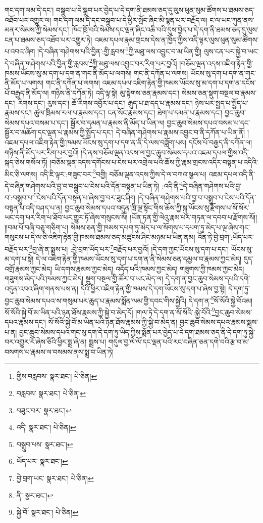 གང་དག་ལམ་དེ་དང་། བསྒྲུབ་པ་དེ་སྒྲུབ་པར་བྱེད་པ་དེ་དག་ནི་ཐམས་ཅད་དུ་ལུས་ཕུན་སུམ་ཚོགས་པ་ཐམས་ཅད་འཐོབ་པར་འགྱུར་ལ། གང་དག་ལམ་དེ་དང་བསྒྲུབ་པ་དེ་ཕྱིར་སྤོང་ཞིང་མི་སྙན་པར་བརྗོད་ལ། ང་ལ་ཡང་ཀུན་ནས་མནར་སེམས་ཀྱི་སེམས་དང་། ཁོང་ཁྲོ་བའི་སེམས་དང་ལྡན་ཞིང་འཆི་བའི་དུས་བྱེད་པ་དེ་དག་ནི་ཐམས་ཅད་དུ་ལུས་ངན་པ་ཐམས་ཅད་འཐོབ་པར་འགྱུར་ཏེ། འཇམ་དཔལ་རྣམ་གྲངས་དེས་ན་ཁྱོད་ཀྱིས་འདི་ལྟར་ལུས་ཕུན་སུམ་ཚོགས་པ་འབའ་ཞིག །དེ་བཞིན་གཤེགས་པའི་བྱིན་:གྱི་རླབས་\footnote{གྱིས་བརླབས་  སྣར་ཐང་།  པེ་ཅིན། }ཀྱི་མཐུ་ལས་འབྱུང་བ་མ་ཡིན་གྱི། ལུས་ངན་པར་སྐྱེ་བ་ཡང་དེ་བཞིན་གཤེགས་པའི་བྱིན་གྱི་རླབས་\footnote{བརླབས་  སྣར་ཐང་།  པེ་ཅིན། }ཀྱི་མཐུ་ལས་འབྱུང་བར་རིག་པར་བྱའོ། །བཅོམ་ལྡན་འདས་འཇིག་རྟེན་གྱི་ཁམས་ཡོངས་སུ་མ་དག་པ་དག་ན་གང་ནི་མོད་པ་ལགས། གང་ནི་དཀོན་པ་ལགས། ཡོངས་སུ་དག་པ་དག་ན་གང་ནི་མོད་པ་ལགས། གང་ནི་དཀོན་པ་ལགས། འཇམ་དཔལ་འཇིག་རྟེན་གྱི་ཁམས་ཡོངས་སུ་མ་དག་པ་དག་ན་དངོས་པོ་བརྒྱད་ནི་མོད་ལ། གཉིས་ནི་དཀོན་ཏེ། འདི་ལྟ་སྟེ། མུ་སྟེགས་ཅན་རྣམས་དང་། སེམས་ཅན་སྡུག་བསྔལ་བ་རྣམས་དང་། རིགས་དང་། རུས་དང་། ཆོ་རིགས་འབྱོར་པ་དང་། རྒུད་པ་ཐ་དད་པ་རྣམས་དང་། ཉེས་པར་སྤྱད་པ་སྤྱོད་པ་རྣམས་དང་། ཚུལ་ཁྲིམས་རལ་པ་རྣམས་དང་། ངན་སོང་རྣམས་དང་། ཐེག་པ་དམན་པ་རྣམས་དང་། བྱང་ཆུབ་སེམས་དཔའ་བསམ་པ་དང་། སྦྱོར་བ་དམན་པ་རྣམས་ནི་མོད་པ་ཡིན་ལ། བྱང་ཆུབ་སེམས་དཔའ་བསམ་པ་དང་སྦྱོར་བ་མཆོག་དང་ལྡན་པ་རྣམས་ཀྱི་སྤྱོད་པ་དང་། དེ་བཞིན་གཤེགས་པ་རྣམས་འབྱུང་བ་ནི་དཀོན་པ་ཡིན་ནོ། །འཇམ་དཔལ་འཇིག་རྟེན་གྱི་ཁམས་ཡོངས་སུ་དག་པ་དག་ན་ནི་དེ་ལས་བཟློག་པས། དངོས་པོ་བརྒྱད་ནི་དཀོན་ལ། གཉིས་ནི་མོད་པར་རིག་པར་བྱའོ། །དེ་ནས་བཅོམ་ལྡན་འདས་ལ་བྱང་ཆུབ་སེམས་དཔའ་འཇམ་དཔལ་གྱིས་འདི་སྐད་ཅེས་གསོལ་ཏོ། །བཅོམ་ལྡན་འདས་དགོངས་པ་ངེས་པར་འགྲེལ་པའི་ཆོས་ཀྱི་རྣམ་གྲངས་འདིར་བསྟན་པ་འདིའི་མིང་ཅི་ལགས། འདི་ཇི་ལྟར་:གཟུང་བར་\footnote{བཟུང་བར་  སྣར་ཐང་། }བགྱི། བཅོམ་ལྡན་འདས་ཀྱིས་དེ་ལ་བཀའ་སྩལ་པ། འཇམ་དཔལ་འདི་ནི་དེ་བཞིན་གཤེགས་པའི་བྱ་བ་བསྒྲུབ་པ་ངེས་པའི་དོན་བསྟན་པ་ཡིན་ཏེ། :འདི་ནི་\footnote{འདི་  སྣར་ཐང་།  པེ་ཅིན། }དེ་བཞིན་གཤེགས་པའི་བྱ་བ་:བསྒྲུབ་པ་\footnote{བསྒྲུབ་པས་  སྣར་ཐང་། }ངེས་པའི་དོན་བསྟན་པ་ཞེས་བྱ་བར་ཟུང་ཤིག །དེ་བཞིན་གཤེགས་པའི་བྱ་བ་བསྒྲུབ་པ་ངེས་པའི་དོན་བསྟན་པ་འདི་བཤད་པ་ན། བྱང་ཆུབ་སེམས་དཔའ་བདུན་ཁྲི་ལྔ་སྟོང་གིས་ཆོས་ཀྱི་སྐུ་ཡོངས་སུ་རྫོགས་པ་སོ་སོར་ཡང་དག་པར་རིག་པ་ཐོབ་པར་གྱུར་ཏོ་ཞེས་གསུངས་སོ། །ཡོན་ཏན་གྱི་ལེའུ་རྣམ་པར་གཏན་ལ་དབབ་པ་རྫོགས་སོ།། །།བམ་པོ་བཞི་བཅུ་གཅིག་པ། སེམས་ཅན་གྱི་ཁམས་དཔག་ཏུ་མེད་པ་ལ་སོགས་པ་དཔག་ཏུ་མེད་པ་ལྔ་ཞེས་གང་གསུངས་པ་དེ་ལ་ཅི་འཇིག་རྟེན་གྱི་ཁམས་ཐམས་ཅད་མཚུངས་ཤིང་མཉམ་པ་ཡིན་ནམ། འོན་ཏེ་བྱེ་བྲག་:ཡོད་པར་བརྗོད་པར་\footnote{ཡོད་པར་  སྣར་ཐང་། }བྱ་ཞེ་ན་སྨྲས་པ། :བྱེ་བྲག་ཡོད་པར་\footnote{བྱེ་བྲག་ཡང་  སྣར་ཐང་།  པེ་ཅིན། }བརྗོད་པར་བྱའོ། །དེ་དག་ཀྱང་ཡོངས་སུ་དག་པ་དང་། ཡོངས་སུ་མ་དག་པ་སྟེ། དེ་ལ་འཇིག་རྟེན་གྱི་ཁམས་ཡོངས་སུ་དག་པ་དག་ན་ནི་སེམས་ཅན་དམྱལ་བ་རྣམས་ཀྱང་མེད། དུད་འགྲོ་རྣམས་ཀྱང་མེད། ཡི་དགས་རྣམས་ཀྱང་མེད། འདོད་པའི་ཁམས་ཀྱང་མེད། གཟུགས་ཀྱི་ཁམས་ཀྱང་མེད། གཟུགས་མེད་པའི་ཁམས་ཀྱང་མེད། སྡུག་བསྔལ་གྱི་ཚོར་བ་ཡང་མེད་ལ། དེ་དག་ན་བྱང་ཆུབ་སེམས་དཔའི་དགེ་འདུན་འབའ་ཞིག་གནས་པས་ན། དེའི་ཕྱིར་འཇིག་རྟེན་གྱི་ཁམས་དེ་དག་ཡོངས་སུ་དག་པ་ཞེས་བྱ་སྟེ། དེ་དག་ཏུ་བྱང་ཆུབ་སེམས་དཔའ་ས་གསུམ་པར་ཆུད་པ་རྣམས་སྨོན་ལམ་གྱི་དབང་གིས་སྐྱེའི། དེ་དག་ན་\footnote{ནི་  སྣར་ཐང་། }སོ་སོའི་སྐྱེ་བོའམ། སོ་སོའི་སྐྱེ་བོ་མ་ཡིན་པའི་ཉན་ཐོས་རྣམས་ཀྱི་སྐྱེ་བ་མེད་དོ། །གལ་ཏེ་དེ་དག་ན་སོ་སོའི་:སྐྱེ་བོའི་\footnote{སྐྱེ་བོ་  སྣར་ཐང་།  པེ་ཅིན། }བྱང་ཆུབ་སེམས་དཔའ་རྣམས་དང་། སོ་སོའི་སྐྱེ་བོ་མ་ཡིན་པའི་ཉན་ཐོས་རྣམས་ཀྱི་སྐྱེ་བ་མེད་ན། བྱང་ཆུབ་སེམས་དཔའ་རྣམས་སྨྲས་པ་ན། བྱང་ཆུབ་སེམས་དཔའ་གང་སུ་དག་དེ་དག་ཏུ་ཡིད་ཀྱིས་སྨོན་པར་བྱེད་པ་དེ་དག་ཐམས་ཅད་ནི་དེ་དག་ཏུ་སྐྱེ་བར་འགྱུར་རོ་ཞེས་ཅིའི་ཕྱིར་སྨྲ་ཞེ་ན། སྨྲས་པ། གདུལ་བྱ་ལེ་ལོ་དང་ལྡན་པའི་རང་བཞིན་ཅན་དགེ་བའི་རྩ་བ་མ་བསགས་པ་རྣམས་ལ་བསམས་ནས་སྨྲ་བ་ཡིན་ཏེ། 